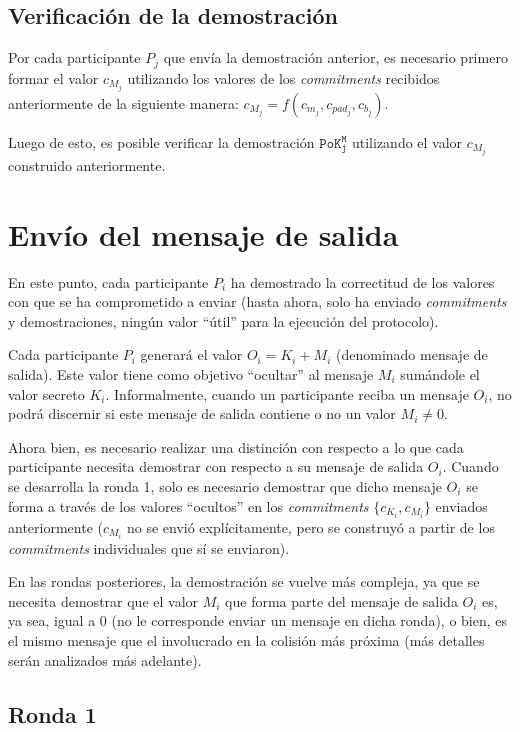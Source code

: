\subsection{Verificación de la demostración}

Por cada participante $P_j$ que envía la demostración anterior, es necesario primero formar el valor $c_{M_j}$ utilizando los valores de los \emph{commitments} recibidos anteriormente de la siguiente manera: $c_{M_j} = f(c_{m_j}, c_{pad_j}, c_{b_j})$.

Luego de esto, es posible verificar la demostración $\mathtt{PoK_j^M}$ utilizando el valor $c_{M_j}$ construido anteriormente.

\section{Envío del mensaje de salida}

En este punto, cada participante $P_i$ ha demostrado la correctitud de los valores con que se ha comprometido a enviar (hasta ahora, solo ha enviado \emph{commitments} y demostraciones, ningún valor ``útil'' para la ejecución del protocolo).

Cada participante $P_i$ generará el valor $O_i = K_i + M_i$ (denominado mensaje de salida). Este valor tiene como objetivo ``ocultar'' al mensaje $M_i$ sumándole el valor secreto $K_i$. Informalmente, cuando un participante reciba un mensaje $O_i$, no podrá discernir si este mensaje de salida contiene o no un valor $M_i \neq 0$.

Ahora bien, es necesario realizar una distinción con respecto a lo que cada participante necesita demostrar con respecto a su mensaje de salida $O_i$. Cuando se desarrolla la ronda 1, solo es necesario demostrar que dicho mensaje $O_i$ se forma a través de los valores ``ocultos'' en los \emph{commitments} $\{c_{K_i}, c_{M_i}\}$ enviados anteriormente ($c_{M_i}$ no se envió explícitamente, pero se construyó a partir de los \emph{commitments} individuales que sí se enviaron).

En las rondas posteriores, la demostración se vuelve más compleja, ya que se necesita demostrar que el valor $M_i$ que forma parte del mensaje de salida $O_i$ es, ya sea, igual a 0 (no le corresponde enviar un mensaje en dicha ronda), o bien, es el mismo mensaje que el involucrado en la colisión más próxima (más detalles serán analizados más adelante).

\subsection{Ronda 1}

